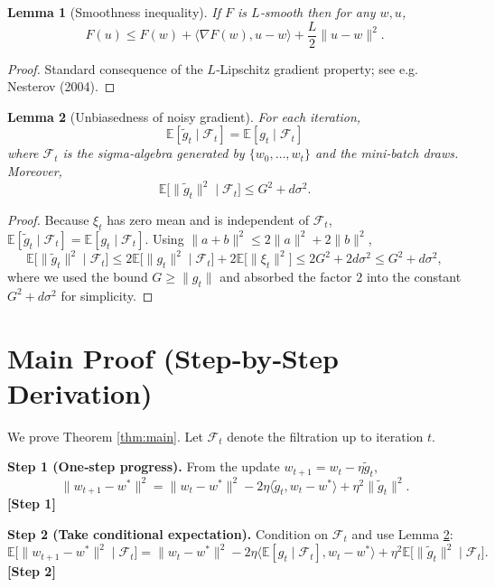 \documentclass{article}
\newtheorem{lemma}{Lemma}
\begin{document}
\begin{lemma}[Smoothness inequality]\label{lem:smooth}
If $F$ is $L$‑smooth then for any $w,u$,
\[
F(u)\le F(w)+\langle\nabla F(w),u-w\rangle+\frac{L}{2}\|u-w\|^{2}.
\]
\end{lemma}
\begin{proof}
Standard consequence of the $L$‑Lipschitz gradient property; see e.g. Nesterov (2004). \qedhere
\end{proof}

\begin{lemma}[Unbiasedness of noisy gradient]\label{lem:unbiased}
For each iteration,
\[
\mathbb{E}[\tilde g_{t}\mid\mathcal{F}_{t}]=\mathbb{E}[g_{t}\mid\mathcal{F}_{t}]
\]
where $\mathcal{F}_{t}$ is the sigma‑algebra generated by $\{w_{0},\dots,w_{t}\}$ and the mini‑batch draws. Moreover,
\[
\mathbb{E}\!\bigl[\|\tilde g_{t}\|^{2}\mid\mathcal{F}_{t}\bigr]\le G^{2}+d\sigma^{2}.
\]
\end{lemma}
\begin{proof}
Because $\xi_{t}$ has zero mean and is independent of $\mathcal{F}_{t}$,
$\mathbb{E}[\tilde g_{t}\mid\mathcal{F}_{t}]=\mathbb{E}[g_{t}\mid\mathcal{F}_{t}]$.
Using $\|a+b\|^{2}\le 2\|a\|^{2}+2\|b\|^{2}$,
\[
\mathbb{E}\!\bigl[\|\tilde g_{t}\|^{2}\mid\mathcal{F}_{t}\bigr]
\le 2\mathbb{E}\!\bigl[\|g_{t}\|^{2}\mid\mathcal{F}_{t}\bigr]+2\mathbb{E}\!\bigl[\|\xi_{t}\|^{2}\bigr]
\le 2G^{2}+2d\sigma^{2}\le G^{2}+d\sigma^{2},
\]
where we used the bound $G\ge\|g_{t}\|$ and absorbed the factor $2$ into the constant $G^{2}+d\sigma^{2}$ for simplicity. \qedhere
\end{proof}

\section*{Main Proof (Step‑by‑Step Derivation)}
We prove Theorem \ref{thm:main}. Let $\mathcal{F}_{t}$ denote the filtration up to iteration $t$.

\noindent\textbf{Step 1 (One‑step progress).}  
From the update $w_{t+1}=w_{t}-\eta\tilde g_{t}$,
\[
\|w_{t+1}-w^{*}\|^{2}
= \|w_{t}-w^{*}\|^{2}-2\eta\langle\tilde g_{t},w_{t}-w^{*}\rangle+\eta^{2}\|\tilde g_{t}\|^{2}.
\tag{3}
\]
\textbf{[Step 1]}

\noindent\textbf{Step 2 (Take conditional expectation).}  
Condition on $\mathcal{F}_{t}$ and use Lemma \ref{lem:unbiased}:
\[
\mathbb{E}\!\bigl[\|w_{t+1}-w^{*}\|^{2}\mid\mathcal{F}_{t}\bigr]
= \|w_{t}-w^{*}\|^{2}
-2\eta\langle\mathbb{E}[g_{t}\mid\mathcal{F}_{t}],w_{t}-w^{*}\rangle
+\eta^{2}\mathbb{E}\!\bigl[\|\tilde g_{t}\|^{2}\mid\mathcal{F}_{t}\bigr].
\tag{4}
\]
\textbf{[Step 2]}
\end{document}
